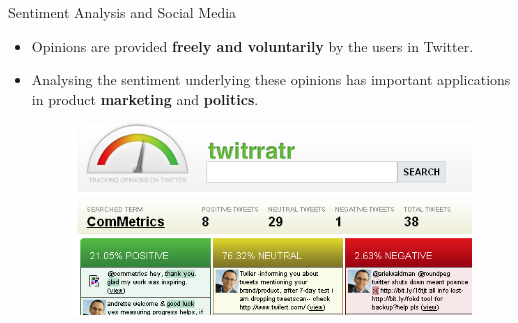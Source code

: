 \documentclass[handout]{beamer}
\begin{document}
\begin{frame}{Sentiment Analysis and Social Media}
\begin{scriptsize}
\begin{itemize}
 \item Opinions are provided \textbf{freely and voluntarily} by the users in Twitter. 
 \item Analysing the sentiment underlying these opinions has important applications in product \textbf{marketing} and \textbf{politics}.
 
   \begin{figure}[h]
        	\includegraphics[scale = 0.6]{pics/tweetOpinions.png}
        \end{figure}
\end{itemize}
\end{scriptsize}




\end{frame}
\end{document}
